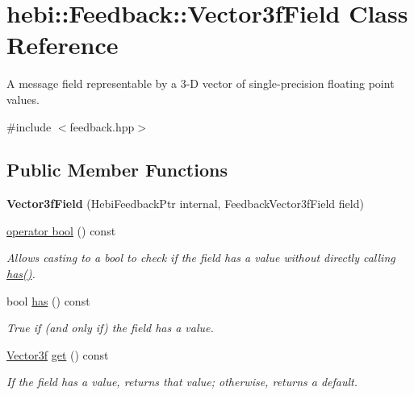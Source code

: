 \hypertarget{classhebi_1_1Feedback_1_1Vector3fField}{}\section{hebi\+:\+:Feedback\+:\+:Vector3f\+Field Class Reference}
\label{classhebi_1_1Feedback_1_1Vector3fField}


A message field representable by a 3-\/D vector of single-\/precision floating point values.  




{\ttfamily \#include $<$feedback.\+hpp$>$}

\subsection*{Public Member Functions}
\begin{DoxyCompactItemize}
\item 
{\bfseries Vector3f\+Field} (Hebi\+Feedback\+Ptr internal, Feedback\+Vector3f\+Field field)\hypertarget{classhebi_1_1Feedback_1_1Vector3fField_ab8f283eb2c0b88ddc08df740233a7d50}{}\label{classhebi_1_1Feedback_1_1Vector3fField_ab8f283eb2c0b88ddc08df740233a7d50}

\item 
\hyperlink{classhebi_1_1Feedback_1_1Vector3fField_a6d43c0cb59b36de35a5bba51b0c5c949}{operator bool} () const 
\begin{DoxyCompactList}\small\item\em Allows casting to a bool to check if the field has a value without directly calling {\ttfamily \hyperlink{classhebi_1_1Feedback_1_1Vector3fField_ab9ad16f406c54f0e60dd0d961bb408fa}{has()}}. \end{DoxyCompactList}\item 
bool \hyperlink{classhebi_1_1Feedback_1_1Vector3fField_ab9ad16f406c54f0e60dd0d961bb408fa}{has} () const \hypertarget{classhebi_1_1Feedback_1_1Vector3fField_ab9ad16f406c54f0e60dd0d961bb408fa}{}\label{classhebi_1_1Feedback_1_1Vector3fField_ab9ad16f406c54f0e60dd0d961bb408fa}

\begin{DoxyCompactList}\small\item\em True if (and only if) the field has a value. \end{DoxyCompactList}\item 
\hyperlink{structhebi_1_1Vector3f}{Vector3f} \hyperlink{classhebi_1_1Feedback_1_1Vector3fField_a65a0b26fbd6da27e2d1492d0a6b4973f}{get} () const \hypertarget{classhebi_1_1Feedback_1_1Vector3fField_a65a0b26fbd6da27e2d1492d0a6b4973f}{}\label{classhebi_1_1Feedback_1_1Vector3fField_a65a0b26fbd6da27e2d1492d0a6b4973f}

\begin{DoxyCompactList}\small\item\em If the field has a value, returns that value; otherwise, returns a default. \end{DoxyCompactList}\end{DoxyCompactItemize}


